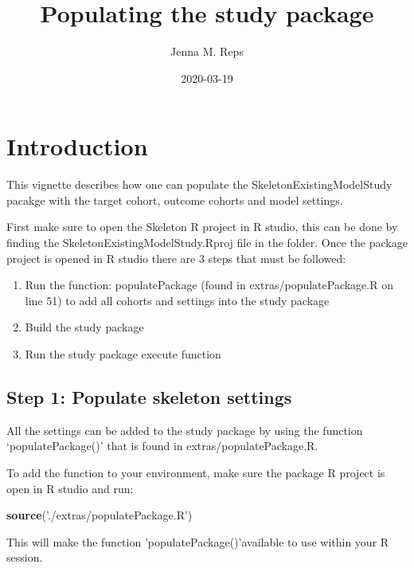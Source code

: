 \documentclass[
]{article}
\title{Populating the study package}
\author{Jenna M. Reps}
\date{2020-03-19}
\newenvironment{Shaded}{\begin{snugshade}}{\end{snugshade}}
\newcommand{\KeywordTok}[1]{\textcolor[rgb]{0.13,0.29,0.53}{\textbf{#1}}}
\newcommand{\NormalTok}[1]{#1}
\newcommand{\StringTok}[1]{\textcolor[rgb]{0.31,0.60,0.02}{#1}}
\providecommand{\tightlist}{%
  \setlength{\itemsep}{0pt}\setlength{\parskip}{0pt}}
\begin{document}
\maketitle

{
\setcounter{tocdepth}{2}
\tableofcontents
}
\hypertarget{introduction}{%
\section{Introduction}\label{introduction}}

This vignette describes how one can populate the
SkeletonExistingModelStudy pacakge with the target cohort, outcome
cohorts and model settings.

First make sure to open the Skeleton R project in R studio, this can be
done by finding the SkeletonExistingModelStudy.Rproj file in the folder.
Once the package project is opened in R studio there are 3 steps that
must be followed:

\begin{enumerate}
\def\labelenumi{\arabic{enumi}.}
\tightlist
\item
  Run the function: populatePackage (found in extras/populatePackage.R
  on line 51) to add all cohorts and settings into the study package
\item
  Build the study package
\item
  Run the study package execute function
\end{enumerate}

\hypertarget{step-1-populate-skeleton-settings}{%
\subsection{Step 1: Populate skeleton
settings}\label{step-1-populate-skeleton-settings}}

All the settings can be added to the study package by using the function
`populatePackage()' that is found in extras/populatePackage.R.

To add the function to your environment, make sure the package R project
is open in R studio and run:

\begin{Shaded}
\begin{Highlighting}[]
\KeywordTok{source}\NormalTok{(}\StringTok{'./extras/populatePackage.R'}\NormalTok{)}
\end{Highlighting}
\end{Shaded}

This will make the function 'populatePackage()'available to use within
your R session.
\end{document}
